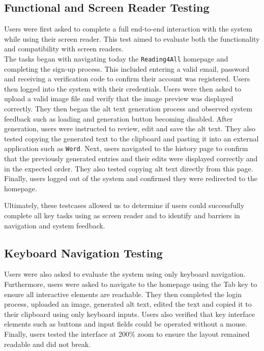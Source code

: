 \documentclass{article}
\begin{document}
\subsection{Functional and Screen Reader Testing}
Users were first asked to complete a full end-to-end interaction with the system while using their screen reader. 
This test aimed to evaluate both the functionality and compatibility with screen readers. \\

The tasks began with navigating today the \texttt{Reading4All} homepage and completing the sign-up process. This included entering a valid email, password and receiving a verification code to confirm their 
account was registered. Users then logged into the system with their credentials. 
Users were then asked to upload a valid image file and verify that the image preview was displayed correctly. 
They then began the alt text generation process and observed system feedback such as loading and generation button becoming disabled. After generation, users were instructed to review, edit and save the alt text. They also tested copying the generated text to the clipboard and pasting it into an external application such as  
\texttt{Word}. Next, users navigated to the history page to confirm that the previously generated entries and their edits were displayed correctly and in the expected order. 
They also tested copying alt text directly from this page. Finally, users logged out of the system and confirmed they were redirected to the homepage. 

Ultimately, these testcases allowed us to determine if users could successfully complete all key tasks using as screen reader and to identify and barriers in navigation and system feedback. 

\subsection{Keyboard Navigation Testing}
Users were also asked to evaluate the system using only keyboard navigation. 
Furthermore, users were asked to navigate to the homepage using the Tab key 
to ensure all interactive elements are reachable. They then completed the login process, uploaded an image, generated alt text, edited the text and copied it to their clipboard
using only keyboard inputs. 
Users also verified that key interface elements such as buttons and input fields could be operated without a mouse.
Finally, users tested the interface at 200\% zoom to ensure the layout remained readable and did not break. 
\end{document}
